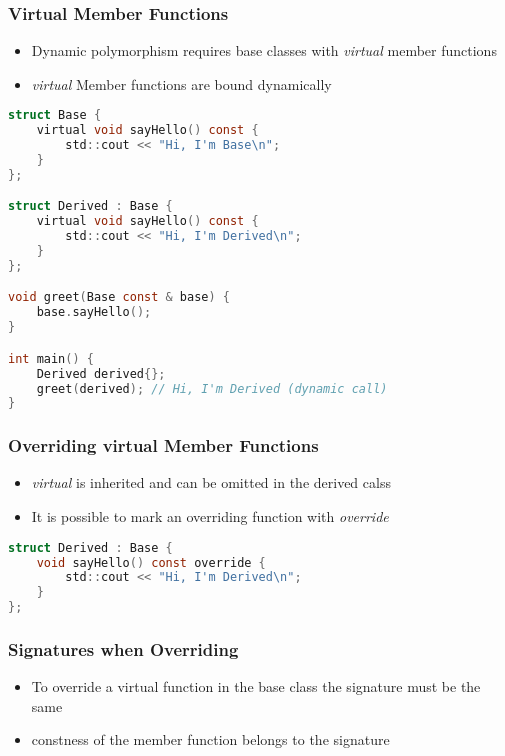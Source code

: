 \pagebreak

\subsubsection{Virtual Member Functions}
\begin{itemize}
    \item Dynamic polymorphism requires base classes with \textit{virtual} member functions
    \item \textit{virtual} Member functions are bound dynamically
\end{itemize}

\begin{lstlisting}[style=frame, style= linenumbers, language=C]
struct Base {
    virtual void sayHello() const {
        std::cout << "Hi, I'm Base\n";
    }
};

struct Derived : Base {
    virtual void sayHello() const {
        std::cout << "Hi, I'm Derived\n";
    }
};

void greet(Base const & base) {
    base.sayHello();
}

int main() {
    Derived derived{};
    greet(derived); // Hi, I'm Derived (dynamic call)
}
\end{lstlisting}

\subsubsection{Overriding virtual Member Functions}
\begin{itemize}
    \item \textit{virtual} is inherited and can be omitted in the derived calss
    \item It is possible to mark an overriding function with \textit{override}
\end{itemize}

\begin{lstlisting}[style=frame, style= linenumbers, language=C]
struct Derived : Base {
    void sayHello() const override {
        std::cout << "Hi, I'm Derived\n";
    }
};
\end{lstlisting}

\subsubsection{Signatures when Overriding}
\begin{itemize}
    \item To override a virtual function in the base class the signature must be the same
    \item constness of the member function belongs to the signature
\end{itemize}

